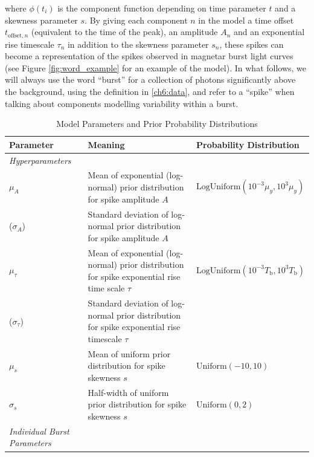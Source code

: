 \documentclass[12pt]{emulateapj}
\newcommand{\counts}{y}
\newcommand{\word}{\phi}
\begin{document}
where $\word(t_i)$ is the component function depending on time parameter $t$ and a skewness
parameter $s$. By giving each component $n$ in the model a time offset $t_{\mathrm{offset},n}$ (equivalent to the time of the peak), 
an amplitude $A_n$ and an exponential rise timescale $\tau_n$ in addition to the skewness parameter $s_n$, 
these spikes can become a representation of the spikes observed in magnetar burst light curves (see Figure \ref{fig:word_example}
for an example of the model). In what follows, we will always use the word ``burst'' for a collection of photons significantly above the background,
using the definition in \ref{ch6:data}, and refer to a ``spike'' when talking about components modelling variability within a burst. 
\begin{table}[hbtp]
\renewcommand{\arraystretch}{1.3}
\footnotesize
\caption{Model Parameters and Prior Probability Distributions}
\begin{threeparttable} 
\begin{tabularx}{\textwidth}{p{2.0cm}p{10.0cm}X}%
\toprule
\bf{Parameter} & \bf{Meaning} & \bf{Probability Distribution} \\ \midrule
\it{Hyperparameters} && \\ \midrule
$\mu_A$ & Mean of exponential (log-normal) prior distribution for spike amplitude $A$ &  $\mathrm{LogUniform}(10^{-3}\mu_\counts, 10^3\mu_\counts)$\tnote{\emph{a}}  \\
($\sigma_A$)\footnotemark[2] & Standard deviation of log-normal prior distribution for spike amplitude $A$ & \\
$\mu_\tau$ & Mean of exponential (log-normal) prior distribution for spike exponential rise time scale $\tau$& $\mathrm{LogUniform}(10^{-3}T_\mathrm{b}, 10^3{T_\mathrm{b}})$\tnote{\emph{c}}  \\
($\sigma_\tau$)\footnotemark[2]  & Standard deviation of log-normal prior distribution for spike exponential rise timescale $\tau$& \\
$\mu_s$ & Mean of uniform prior distribution for spike skewness $s$ & $\mathrm{Uniform}(-10, 10)$ \\
$\sigma_s$ & Half-width of uniform prior distribution for spike skewness $s$& $\mathrm{Uniform}(0,2)$\\ \midrule
\it{Individual Burst Parameters} && \\ \midrule

\end{tabularx}
\end{threeparttable}
\end{table}
\end{document}
